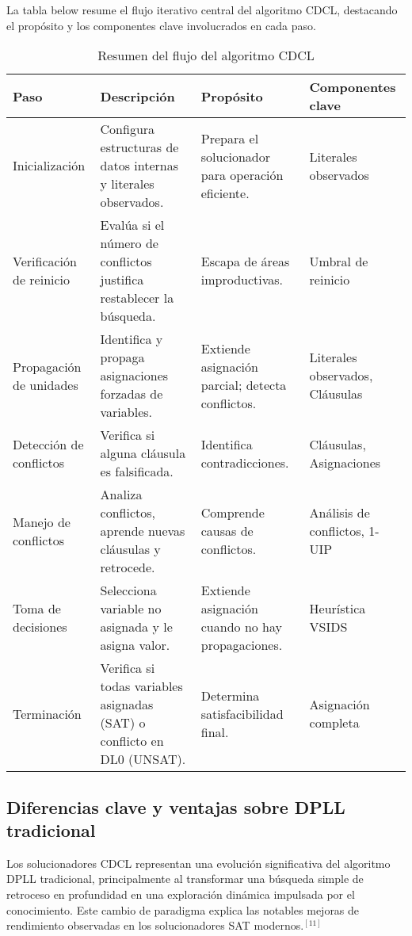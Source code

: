 \documentclass{article}
\begin{document}
La tabla below resume el flujo iterativo central del algoritmo CDCL, destacando el propósito y los componentes clave involucrados en cada paso.

\begin{table}[ht]
\centering
\caption{Resumen del flujo del algoritmo CDCL}
\label{tab:cdcl_flow}
\small
\begin{tabular}{|p{2.2cm}|p{3.5cm}|p{3.5cm}|p{2.8cm}|}
\hline
\textbf{Paso} & \textbf{Descripción} & \textbf{Propósito} & \textbf{Componentes clave} \\
\hline
Inicialización & Configura estructuras de datos internas y literales observados. & Prepara el solucionador para operación eficiente. & Literales observados \\
\hline
Verificación de reinicio & Evalúa si el número de conflictos justifica restablecer la búsqueda. & Escapa de áreas improductivas. & Umbral de reinicio \\
\hline
Propagación de unidades & Identifica y propaga asignaciones forzadas de variables. & Extiende asignación parcial; detecta conflictos. & Literales observados, Cláusulas \\
\hline
Detección de conflictos & Verifica si alguna cláusula es falsificada. & Identifica contradicciones. & Cláusulas, Asignaciones \\
\hline
Manejo de conflictos & Analiza conflictos, aprende nuevas cláusulas y retrocede. & Comprende causas de conflictos. & Análisis de conflictos, 1-UIP \\
\hline
Toma de decisiones & Selecciona variable no asignada y le asigna valor. & Extiende asignación cuando no hay propagaciones. & Heurística VSIDS \\
\hline
Terminación & Verifica si todas variables asignadas (SAT) o conflicto en DL0 (UNSAT). & Determina satisfacibilidad final. & Asignación completa \\
\hline
\end{tabular}
\end{table}
\newpage

\subsection{Diferencias clave y ventajas sobre DPLL tradicional}

Los solucionadores CDCL representan una evolución significativa del algoritmo DPLL tradicional, principalmente al transformar una búsqueda simple de retroceso en profundidad en una exploración dinámica impulsada por el conocimiento. Este cambio de paradigma explica las notables mejoras de rendimiento observadas en los solucionadores SAT modernos.$^{[11]}$
\end{document}
